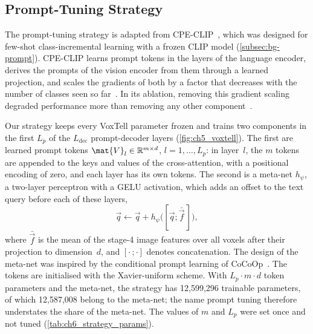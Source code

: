 \subsection{Prompt-Tuning Strategy}
\label{subsec:method-prompt}

The prompt-tuning strategy is adapted from CPE-CLIP~\cite{D_Alessandro_2023}, which was designed for few-shot class-incremental learning with a frozen CLIP model (\cref{subsec:bg-prompt}).
CPE-CLIP learns prompt tokens in the layers of the language encoder, derives the prompts of the vision encoder from them through a learned projection, and scales the gradients of both by a factor that decreases with the number of classes seen so far~\cite[Sec.~4, Eqs.~11--13]{D_Alessandro_2023}.
In its ablation, removing this gradient scaling degraded performance more than removing any other component~\cite[Sec.~5.5, Fig.~2]{D_Alessandro_2023}.

Our strategy keeps every VoxTell parameter frozen and trains two components in the first $L_p$ of the $L_{\mathrm{dec}}$ prompt-decoder layers (\cref{fig:ch5_voxtell}).
The first are learned prompt tokens $\mat{V}_l \in \mathbb{R}^{m \times d}$, $l = 1, \dots, L_p$: in layer~$l$, the $m$ tokens are appended to the keys and values of the cross-attention, with a positional encoding of zero, and each layer has its own tokens.
The second is a meta-net $h_\psi$, a two-layer perceptron with a GELU activation, which adds an offset to the text query before each of these layers,
\begin{equation}
\vec{q} \leftarrow \vec{q} + h_\psi\big([\vec{q}; \bar{\vec{f}}\,]\big),
\label{eq:method-metanet}
\end{equation}
where $\bar{\vec{f}}$ is the mean of the stage-4 image features over all voxels after their projection to dimension~$d$, and $[\cdot\,;\cdot]$ denotes concatenation.
The design of the meta-net was inspired by the conditional prompt learning of CoCoOp~\cite{zhou2022cocoop}.
The tokens are initialised with the Xavier-uniform scheme.
With $L_p \cdot m \cdot d$ token parameters and the meta-net, the strategy has 12{,}599{,}296 trainable parameters, of which 12{,}587{,}008 belong to the meta-net; the name prompt tuning therefore understates the share of the meta-net.
The values of $m$ and $L_p$ were set once and not tuned (\cref{tab:ch6_strategy_params}).

